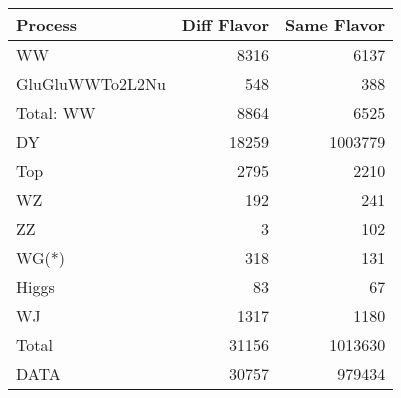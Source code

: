 \begin{table}[ht]
	\centering
\begin{tabular}{lrr}

         Process &  Diff Flavor &  Same Flavor \\
		\hline
              WW &         8316 &         6137 \\
 GluGluWWTo2L2Nu &          548 &          388 \\
\hline
       Total: WW &         8864 &         6525 \\
              DY &        18259 &      1003779 \\
             Top &         2795 &         2210 \\
              WZ &          192 &          241 \\
              ZZ &            3 &          102 \\
           WG(*) &          318 &          131 \\
           Higgs &           83 &           67 \\
              WJ &         1317 &         1180 \\
\hline
           Total &        31156 &      1013630 \\
            DATA &        30757 &       979434 \\


\end{tabular}

\end{table}